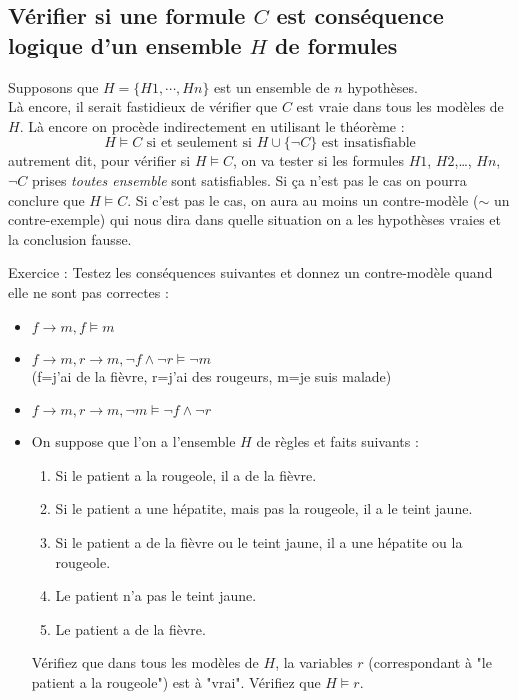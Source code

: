 \subsection{Vérifier si une formule $C$ est conséquence logique d'un ensemble $H$ de formules}
Supposons que $H=\{H1,\cdots,Hn\}$ est un ensemble de $n$ hypothèses.\\
Là encore, il serait fastidieux de vérifier que $C$ est vraie dans tous les modèles de $H$. Là encore on procède indirectement en utilisant le théorème : 
\[H\models C \mbox{ si et seulement si } H\cup\{\neg C\}\mbox{ est insatisfiable}\]
autrement dit, pour vérifier si $H\models C$, on va tester si les formules $H1$, $H2$,\ldots, $Hn$, $\neg C$ prises \emph{toutes ensemble} sont satisfiables. Si ça n'est pas le cas on pourra conclure que $H\models C$. Si c'est pas le cas, on aura au moins un contre-modèle ($\sim$ un contre-exemple) qui nous dira dans quelle situation on a les hypothèses vraies et la conclusion fausse.

Exercice : Testez les conséquences suivantes et donnez un contre-modèle quand elle ne sont pas correctes : 
\begin{itemize}
\item $f\rightarrow m, f \models m$
\item $f\rightarrow m, r\rightarrow m, \neg f\wedge \neg r \models \neg m$\\
(f=j'ai de la fièvre, r=j'ai des rougeurs, m=je suis malade)
\item $f\rightarrow m, r\rightarrow m, \neg m\models \neg f\wedge \neg r $


\item On suppose que l’on a l'ensemble $H$ de règles et faits suivants :

\begin{enumerate}
\item Si le patient a la rougeole, il a de la fièvre.
\item Si le patient a une hépatite, mais pas la rougeole, il a le teint jaune.
\item Si le patient a de la fièvre ou le teint jaune, il a une hépatite ou la rougeole.
\item Le patient n’a pas le teint jaune.
\item Le patient a de la fièvre.
\end{enumerate}

Vérifiez que dans tous les modèles de $H$, la variables $r$ (correspondant à "le patient a la rougeole") est à "vrai". Vérifiez que $H \models r$.
\end{itemize}
\newpage
